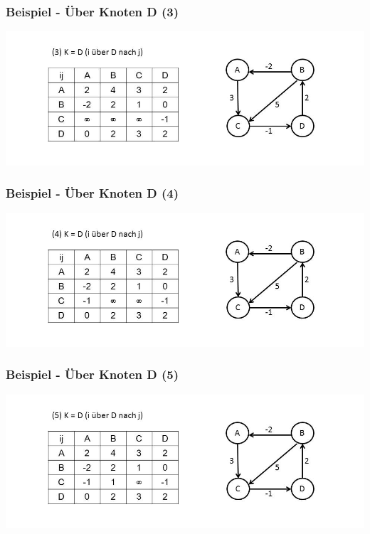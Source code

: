 
\begin{frame}
\frametitle{Beispiel - Über Knoten D (3)}

\includegraphics[width=\linewidth]{floyd_warshall_graphs/graph7.JPG}

\end{frame}


\begin{frame}
\frametitle{Beispiel - Über Knoten D (4)}

\includegraphics[width=\linewidth]{floyd_warshall_graphs/graph8.JPG}

\end{frame}


\begin{frame}
\frametitle{Beispiel - Über Knoten D (5)}

\includegraphics[width=\linewidth]{floyd_warshall_graphs/graph9.JPG}

\end{frame}

